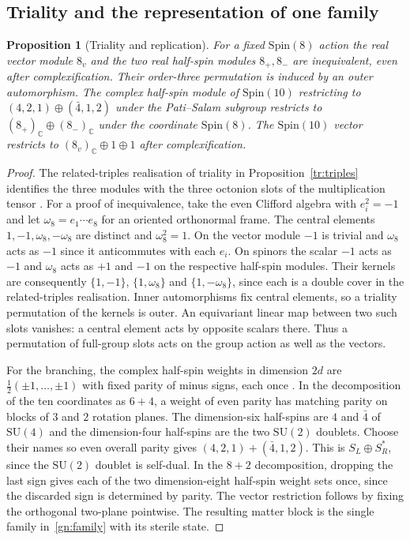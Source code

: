 \documentclass[aps,pra,onecolumn,superscriptaddress,nofootinbib,10pt]{revtex4-2}
\newtheorem{proposition}[theorem]{Proposition}
\theoremstyle{definition}
\theoremstyle{remark}
\newcommand{\SU}{\mathrm{SU}}
\begin{document}
\subsection{Triality and the representation of one family}\label{gn:spin}

\begin{proposition}[Triality and replication]\label{gn:triality}
For a fixed $\mathrm{Spin}(8)$ action the real vector module $8_v$
and the two real half-spin modules $8_+,8_-$ are inequivalent, even
after complexification. Their order-three permutation is induced
by an outer automorphism. The complex half-spin module of
$\mathrm{Spin}(10)$ restricting to $(4,2,1)\oplus(\bar4,1,2)$
under the Pati--Salam subgroup restricts to $(8_+)_{\mathbb C}
\oplus(8_-)_{\mathbb C}$ under the coordinate $\mathrm{Spin}(8)$.
The $\mathrm{Spin}(10)$ vector restricts to
$(8_v)_{\mathbb C}\oplus1\oplus1$ after complexification.
\end{proposition}
\begin{proof}
The related-triples realisation of triality
in Proposition~\ref{tr:triples}
identifies the three modules with the three octonion slots
of the multiplication tensor \cite[\S2.4]{Baez}.
For a proof of inequivalence, take the even Clifford algebra
with $e_i^2=-1$ and let $\omega_8=e_1\cdots e_8$ for an oriented
orthonormal frame. The central elements $1,-1,\omega_8,-\omega_8$
are distinct and $\omega_8^2=1$. On the vector module $-1$ is
trivial and $\omega_8$ acts as $-1$ since it anticommutes with
each $e_i$. On spinors the scalar $-1$ acts as $-1$ and
$\omega_8$ acts as $+1$ and $-1$ on the respective half-spin
modules. Their kernels are consequently
$\{1,-1\}$, $\{1,\omega_8\}$ and $\{1,-\omega_8\}$, since each
is a double cover in the related-triples realisation. Inner
automorphisms fix central elements, so a triality permutation
of the kernels is outer. An equivariant linear map between
two such slots vanishes: a central element acts by opposite
scalars there. Thus a permutation of full-group slots acts on
the group action as well as the vectors.

For the branching, the complex half-spin weights in dimension
$2d$ are $\frac12(\pm1,\ldots,\pm1)$ with fixed parity of minus
signs, each once \cite{cr:lawson,BaezHuerta}. In the decomposition of
the ten coordinates as $6+4$, a weight of even parity has matching
parity on blocks of $3$ and $2$ rotation planes. The dimension-six
half-spins are $4$ and $\bar4$ of $\SU(4)$ and the
dimension-four half-spins are the two $\SU(2)$ doublets.
Choose their names so even overall parity gives
$(4,2,1)+(\bar4,1,2)$. This is $S_L\oplus S_R^*$, since the
$\SU(2)$ doublet is self-dual. In the $8+2$
decomposition, dropping the last sign gives each of the
two dimension-eight half-spin weight sets once, since the
discarded sign is determined by parity. The vector restriction
follows by fixing the orthogonal two-plane pointwise. The
resulting matter block is the single family in~\eqref{gn:family}
with its sterile state.
\end{proof}
\end{document}
